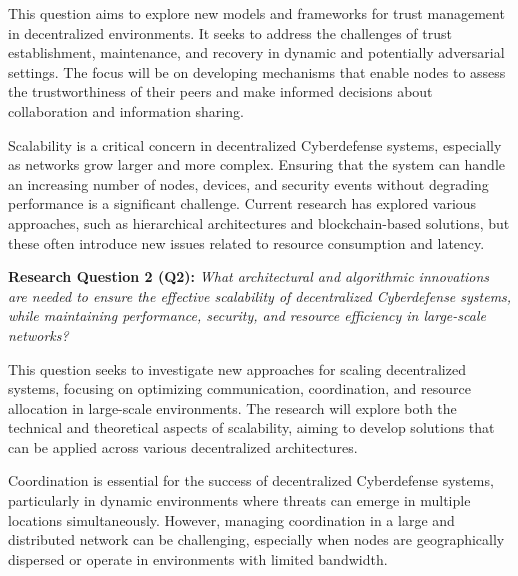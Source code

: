 This question aims to explore new models and frameworks for trust management in decentralized environments. It seeks to address the challenges of trust establishment, maintenance, and recovery in dynamic and potentially adversarial settings. The focus will be on developing mechanisms that enable nodes to assess the trustworthiness of their peers and make informed decisions about collaboration and information sharing.


Scalability is a critical concern in decentralized Cyberdefense systems, especially as networks grow larger and more complex. Ensuring that the system can handle an increasing number of nodes, devices, and security events without degrading performance is a significant challenge. Current research has explored various approaches, such as hierarchical architectures and blockchain-based solutions, but these often introduce new issues related to resource consumption and latency.

\textbf{Research Question 2 (Q2):} \textit{What architectural and algorithmic innovations are needed to ensure the effective scalability of decentralized Cyberdefense systems, while maintaining performance, security, and resource efficiency in large-scale networks?}

This question seeks to investigate new approaches for scaling decentralized systems, focusing on optimizing communication, coordination, and resource allocation in large-scale environments. The research will explore both the technical and theoretical aspects of scalability, aiming to develop solutions that can be applied across various decentralized architectures.


Coordination is essential for the success of decentralized Cyberdefense systems, particularly in dynamic environments where threats can emerge in multiple locations simultaneously. However, managing coordination in a large and distributed network can be challenging, especially when nodes are geographically dispersed or operate in environments with limited bandwidth.

